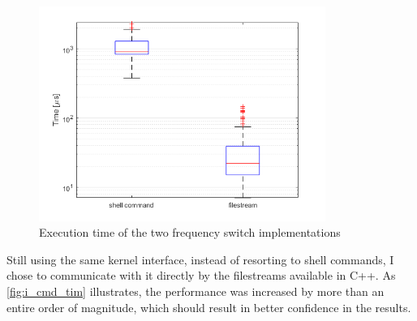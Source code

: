 \begin{figure}[H]
  \centering
  \includegraphics[height=7cm]{figures/cmd_time}
  \caption[Command Time]{Execution time of the two frequency switch implementations}\label{fig:i_cmd_tim}
\end{figure}
Still using the same kernel interface, instead of resorting to shell commands, I chose to communicate with it directly by the filestreams available in C++. As \autoref{fig:i_cmd_tim} illustrates, the performance was  increased by more than an entire order of magnitude, which should result in better confidence in the results.
